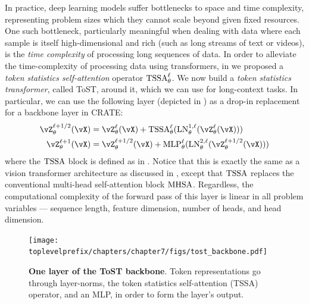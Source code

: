 \documentclass[../../book-main.tex]{subfiles}
\begin{document}
In practice, deep learning models suffer bottlenecks to space and time complexity, representing problem sizes which they cannot scale beyond given fixed resources. One such bottleneck, particularly meaningful when dealing with data where each sample is itself high-dimensional and rich (such as long streams of text or videos), is the \textit{time complexity} of processing long sequences of data. In order to alleviate the time-complexity of processing data using transformers, in  we proposed a \textit{token statistics self-attention} operator \(\operatorname{TSSA}_{\theta}^{\ell}\). We now build a \textit{token statistics transformer}, called ToST, around it, which we can use for long-context tasks. In particular, we can use the following layer (depicted in ) as a drop-in replacement for a backbone layer in CRATE:
\begin{align}
    \vZ_{\theta}^{\ell + 1/2}(\vX)
    &= \vZ_{\theta}^{\ell}(\vX) + \TSSA_{\theta}^{\ell}(\LN_{\theta}^{1, \ell}(\vZ_{\theta}^{\ell}(\vX))) \\ 
    \vZ_{\theta}^{\ell + 1}(\vX)
    &= \vZ_{\theta}^{\ell + 1/2}(\vX) + \MLP_{\theta}^{\ell}(\LN_{\theta}^{2, \ell}(\vZ_{\theta}^{\ell + 1/2}(\vX)))
\end{align}
where the \(\operatorname{TSSA}\) block is defined as in . Notice that this is exactly the same as a vision transformer architecture as discussed in , except that \(\operatorname{TSSA}\) replaces the conventional multi-head self-attention block \(\operatorname{MHSA}\). Regardless, the computational complexity of the forward pass of this layer is linear in all problem variables --- sequence length, feature dimension, number of heads, and head dimension.

\begin{figure}[!htbp]
    \centering 
    \texttt{[image: \\toplevelprefix/chapters/chapter7/figs/tost\_backbone.pdf]}
    \caption{\small\textbf{One layer of the ToST backbone}. Token representations go through layer-norms, the token statistics self-attention (TSSA) operator, and an MLP, in order to form the layer's output.}
    \label{fig:tost_backbone}
\end{figure}
\end{document}
